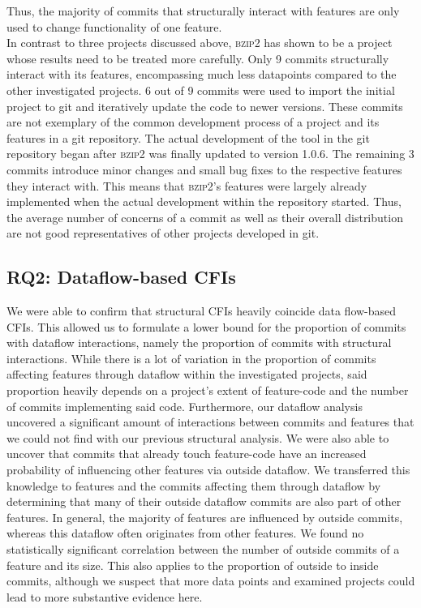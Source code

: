 Thus, the majority of commits that structurally interact with features are only used to change functionality of one feature. \\
In contrast to three projects discussed above, \textsc{bzip2} has shown to be a project whose results need to be treated more carefully.
Only 9 commits structurally interact with its features, encompassing much less datapoints compared to the other investigated projects.
6 out of 9 commits were used to import the initial project to git and iteratively update the code to newer versions.
These commits are not exemplary of the common development process of a project and its features in a git repository.
The actual development of the tool in the git repository began after \textsc{bzip2} was finally updated to version 1.0.6.
The remaining 3 commits introduce minor changes and small bug fixes to the respective features they interact with.
This means that \textsc{bzip2}'s features were largely already implemented when the actual development within the repository started.
Thus, the average number of concerns of a commit as well as their overall distribution are not good representatives of other projects developed in git. 

\subsection*{\textbf{RQ2: Dataflow-based CFIs}}\label{sec:disc_df_cfis}

We were able to confirm that structural CFIs heavily coincide data flow-based CFIs.
This allowed us to formulate a lower bound for the proportion of commits with dataflow interactions, namely the proportion of commits with structural interactions.
While there is a lot of variation in the proportion of commits affecting features through dataflow within the investigated projects, said proportion heavily depends on a project's extent of feature-code and the number of commits implementing said code.
Furthermore, our dataflow analysis uncovered a significant amount of interactions between commits and features that we could not find with our previous structural analysis.
We were also able to uncover that commits that already touch feature-code have an increased probability of influencing other features via outside dataflow.
We transferred this knowledge to features and the commits affecting them through dataflow by determining that many of their outside dataflow commits are also part of other features.
In general, the majority of features are influenced by outside commits, whereas this dataflow often originates from other features.
We found no statistically significant correlation between the number of outside commits of a feature and its size.
This also applies to the proportion of outside to inside commits, although we suspect that more data points and examined projects could lead to more substantive evidence here.

